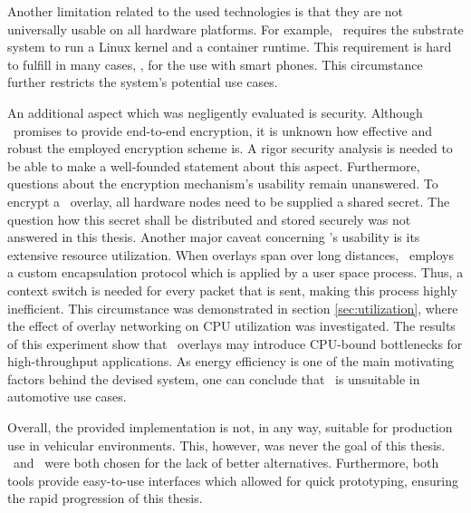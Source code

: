 Another limitation related to the used technologies is that they are not universally usable on all hardware platforms. For example, \docker\ requires the substrate system to run a Linux kernel and a container runtime. This requirement is hard to fulfill in many cases, \eg , for the use with smart phones. This circumstance further restricts the system's potential use cases.

An additional aspect which was negligently evaluated is security. Although \linebreak\wnet\ promises to provide end-to-end encryption, it is unknown how effective and robust the employed encryption scheme is. A rigor security analysis is needed to be able to make a well-founded statement about this aspect. Furthermore, questions about the encryption mechanism's usability remain unanswered. To encrypt a \weave\ overlay, all hardware nodes need to be supplied a shared secret. The question how this secret shall be distributed and stored securely was not answered in this thesis. 
Another major caveat concerning \weave 's usability is its extensive resource utilization.  When overlays span over long distances, \weave\ employs a custom encapsulation protocol which is applied by a user space process. Thus, a context switch is needed for every packet that is sent, making this process highly inefficient. This circumstance was demonstrated in section \ref{sec:utilization}, where the effect of overlay networking on CPU utilization was investigated. The results of this experiment show that \weave\ overlays may introduce CPU-bound bottlenecks for high-throughput applications. As energy efficiency is one of the main motivating factors behind the devised system, one can conclude that \wnet\ is unsuitable in automotive use cases.

Overall, the provided implementation is not, in any way, suitable for production use in vehicular environments. This, however, was never the goal of this thesis. \wnet\ and \docker\ were both chosen for the lack of better alternatives. Furthermore, both tools provide easy-to-use interfaces which allowed for quick prototyping, ensuring the rapid progression of this thesis. 

